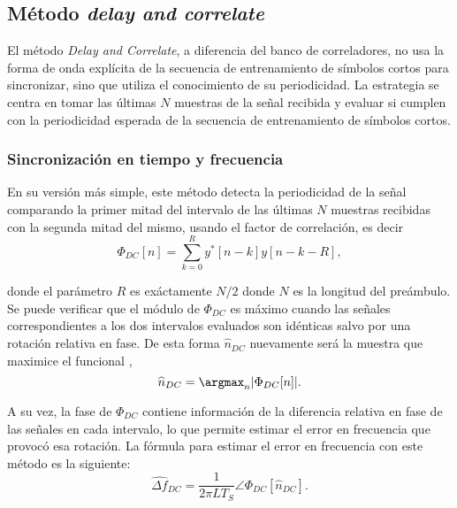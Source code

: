 \subsection{Método \textit{delay and correlate}}
\label{S:ch3-dac}

El método \textit{Delay and Correlate}, a diferencia del banco de correladores, no usa la forma de onda explícita de la secuencia de entrenamiento de símbolos cortos para sincronizar, sino que utiliza el conocimiento de su periodicidad. La estrategia se centra en tomar las últimas $N$ muestras de la señal recibida y evaluar si cumplen con la periodicidad esperada de la secuencia de entrenamiento de símbolos cortos. 

\subsubsection{Sincronización en tiempo y frecuencia}
\label{Ss:ch3-dac-principio}

En su versión más simple, este método detecta la periodicidad de la señal comparando la primer mitad del intervalo de las últimas $N$ muestras recibidas con la segunda mitad del mismo, usando el factor de correlación, es decir
\begin{equation}\label{eq:dac-estimator}
    \Phi_{DC}[n] = \sum_{k=0}^{R}y^\ast[n-k]y[n-k-R],
\end{equation}

donde el parámetro $R$ es exáctamente $N/2$ donde $N$ es la longitud del preámbulo. Se puede verificar que el módulo de $\Phi_{DC}$ es máximo cuando las señales correspondientes a los dos intervalos evaluados son idénticas salvo por una rotación relativa en fase. De esta forma $\widehat{n}_{DC}$ nuevamente será la muestra que maximice el \color{RoyalBlue} funcional \color{black},
\begin{equation}
    \widehat{n}_{DC} = \argmax_n\lvert \Phi_{DC}[n] \lvert.
\end{equation}

A su vez, la fase de $\Phi_{DC}$ contiene información de la diferencia relativa en fase de las señales en cada intervalo, lo que permite estimar el error en frecuencia que provocó esa rotación. La fórmula para estimar el error en frecuencia con este método es la siguiente:
\begin{equation}\label{eq:freq-est-dac}
    \widehat{\Delta f}_{DC} = \frac{1}{2\pi L T_S}\angle\Phi_{DC}[\widehat{n}_{DC}].
\end{equation}

